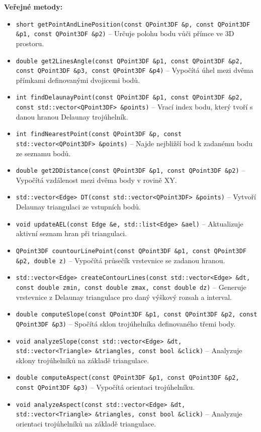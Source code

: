 \textbf{Veřejné metody:}
\begin{itemize}
\item \texttt{short getPointAndLinePosition(const QPoint3DF \&p, const QPoint3DF \&p1, const QPoint3DF \&p2)} – Určuje polohu bodu vůči přímce ve 3D prostoru.
\item \texttt{double get2LinesAngle(const QPoint3DF \&p1, const QPoint3DF \&p2, const QPoint3DF \&p3, const QPoint3DF \&p4)} – Vypočítá úhel mezi dvěma přímkami definovanými dvojicemi bodů.
\item \texttt{int findDelaunayPoint(const QPoint3DF \&p1, const QPoint3DF \&p2, const std::vector<QPoint3DF> \&points)} – Vrací index bodu, který tvoří s danou hranou Delaunay trojúhelník.
\item \texttt{int findNearestPoint(const QPoint3DF \&p, const std::vector<QPoint3DF> \&points)} – Najde nejbližší bod k zadanému bodu ze seznamu bodů.
\item \texttt{double get2DDistance(const QPoint3DF \&p1, const QPoint3DF \&p2)} – Vypočítá vzdálenost mezi dvěma body v rovině XY.
\item \texttt{std::vector<Edge> DT(const std::vector<QPoint3DF> \&points)} – Vytvoří Delaunay triangulaci ze vstupních bodů.
\item \texttt{void updateAEL(const Edge \&e, std::list<Edge> \&ael)} – Aktualizuje aktivní seznam hran při triangulaci.
\item \texttt{QPoint3DF countourLinePoint(const QPoint3DF \&p1, const QPoint3DF \&p2, double z)} – Vypočítá průsečík vrstevnice se zadanou hranou.
\item \texttt{std::vector<Edge> createContourLines(const std::vector<Edge> \&dt, const double zmin, const double zmax, const double dz)} – Generuje vrstevnice z Delaunay triangulace pro daný výškový rozsah a interval.
\item \texttt{double computeSlope(const QPoint3DF \&p1, const QPoint3DF \&p2, const QPoint3DF \&p3)} – Spočítá sklon trojúhelníka definovaného třemi body.
\item \texttt{void analyzeSlope(const std::vector<Edge> \&dt, std::vector<Triangle> \&triangles, const bool \&click)} – Analyzuje sklony trojúhelníků na základě triangulace.
\item \texttt{double computeAspect(const QPoint3DF \&p1, const QPoint3DF \&p2, const QPoint3DF \&p3)} – Vypočítá orientaci trojúhelníku.
\item \texttt{void analyzeAspect(const std::vector<Edge> \&dt, std::vector<Triangle> \&triangles, const bool \&click)} – Analyzuje orientaci trojúhelníků na základě triangulace.

\end{itemize}
